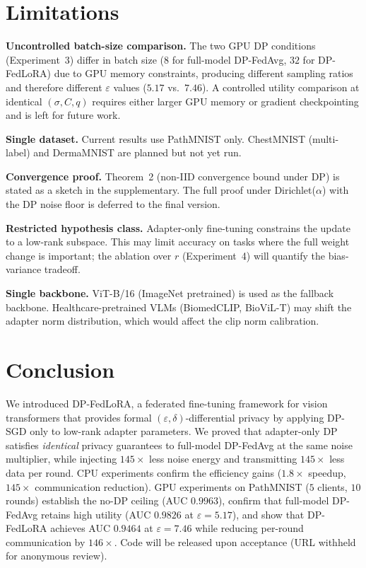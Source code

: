 ﻿\documentclass{article}
\newcommand{\method}{DP-FedLoRA}
\renewcommand{\eps}{\varepsilon}
\newcommand{\noise}{\sigma}
\newcommand{\clip}{C}
\begin{document}
\section{Limitations}
\label{sec:limitations}

\textbf{Uncontrolled batch-size comparison.}
The two GPU DP conditions (Experiment~3) differ in batch size ($8$ for
full-model DP-FedAvg, $32$ for \method{}) due to GPU memory constraints,
producing different sampling ratios and therefore different $\eps$ values
($5.17$ vs.\ $7.46$).
A controlled utility comparison at identical $(\noise, \clip, q)$ requires
either larger GPU memory or gradient checkpointing and is left for future
work.

\textbf{Single dataset.}
Current results use PathMNIST only.
ChestMNIST (multi-label) and DermaMNIST are planned but not yet run.

\textbf{Convergence proof.}
Theorem~2 (non-IID convergence bound under DP) is stated as a sketch in
the supplementary.
The full proof under Dirichlet($\alpha$) with the DP noise floor is
deferred to the final version.

\textbf{Restricted hypothesis class.}
Adapter-only fine-tuning constrains the update to a low-rank subspace.
This may limit accuracy on tasks where the full weight change is
important; the ablation over $r$ (Experiment~4) will quantify the
bias-variance tradeoff.

\textbf{Single backbone.}
ViT-B/16 (ImageNet pretrained) is used as the fallback backbone.
Healthcare-pretrained VLMs (BiomedCLIP, BioViL-T) may shift the
adapter norm distribution, which would affect the clip norm calibration.

\section{Conclusion}
\label{sec:conclusion}

We introduced \method{}, a federated fine-tuning framework for vision
transformers that provides formal $(\eps, \delta)$-differential privacy
by applying DP-SGD only to low-rank adapter parameters.
We proved that adapter-only DP satisfies \emph{identical} privacy
guarantees to full-model DP-FedAvg at the same noise multiplier, while
injecting $145{\times}$ less noise energy and transmitting $145{\times}$
less data per round.
CPU experiments confirm the efficiency gains ($1.8{\times}$ speedup,
$145{\times}$ communication reduction).
GPU experiments on PathMNIST ($5$ clients, $10$ rounds) establish the
no-DP ceiling (AUC $0.9963$), confirm that full-model DP-FedAvg retains
high utility (AUC $0.9826$ at $\eps{=}5.17$), and show that \method{}
achieves AUC $0.9464$ at $\eps{=}7.46$ while reducing per-round
communication by $146{\times}$.
Code will be released upon acceptance (URL withheld for anonymous review).
\end{document}
